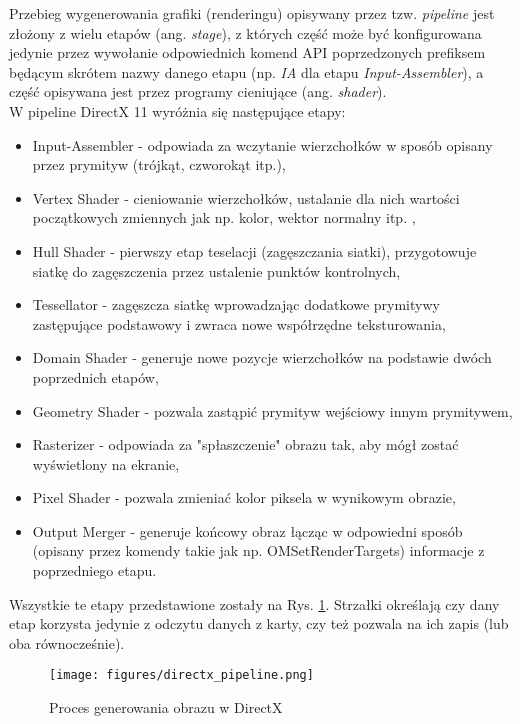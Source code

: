 Przebieg wygenerowania grafiki (renderingu) opisywany przez tzw. \emph{pipeline} jest złożony z wielu etapów (ang. \emph{stage}), z których część może być konfigurowana jedynie przez wywołanie odpowiednich komend API poprzedzonych prefiksem będącym skrótem nazwy danego etapu (np. \emph{IA} dla etapu \emph{Input-Assembler}), a część opisywana jest przez programy cieniujące (ang. \emph{shader}).\\
W pipeline DirectX 11 wyróżnia się następujące etapy:
\begin{itemize}
\item Input-Assembler - odpowiada za wczytanie wierzchołków w sposób opisany przez prymityw (trójkąt, czworokąt itp.),
\item Vertex Shader - cieniowanie wierzchołków, ustalanie dla nich wartości początkowych zmiennych jak np. kolor, wektor normalny itp. ,
\item Hull Shader - pierwszy etap teselacji (zagęszczania siatki), przygotowuje siatkę do zagęszczenia przez ustalenie punktów kontrolnych,
\item Tessellator - zagęszcza siatkę wprowadzając dodatkowe prymitywy zastępujące podstawowy i zwraca nowe współrzędne teksturowania,
\item Domain Shader - generuje nowe pozycje wierzchołków na podstawie dwóch poprzednich etapów,
\item Geometry Shader - pozwala zastąpić prymityw wejściowy innym prymitywem,
\item Rasterizer - odpowiada za "spłaszczenie" obrazu tak, aby mógł zostać wyświetlony na ekranie,
\item Pixel Shader - pozwala zmieniać kolor piksela w wynikowym obrazie,
\item Output Merger - generuje końcowy obraz łącząc w odpowiedni sposób (opisany przez komendy takie jak np. OMSetRenderTargets) informacje z poprzedniego etapu.
\end{itemize}

Wszystkie te etapy przedstawione zostały na Rys. \ref{directx_pipeline}. Strzałki określają czy dany etap korzysta jedynie z odczytu danych z karty, czy też pozwala na ich zapis (lub oba równocześnie).

\begin{figure}
\begin{center}
\texttt{[image: figures/directx\_pipeline.png]}
\caption{Proces generowania obrazu w DirectX}
\label{directx_pipeline}
\end{center}
\end{figure}

